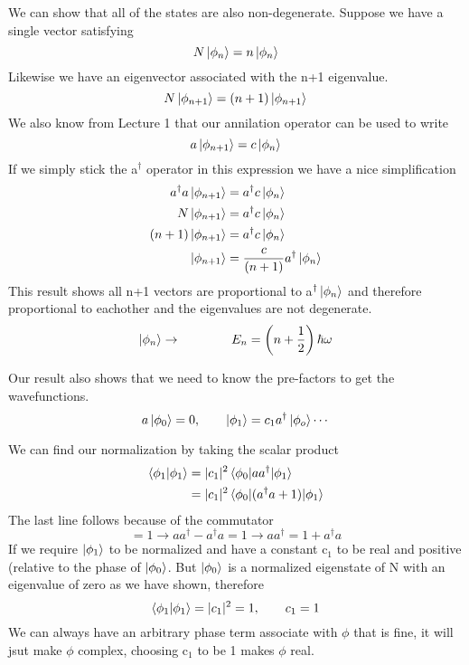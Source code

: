 \documentclass{article}
\newcommand{\be}{\begin{equation}}
\newcommand{\ee}{\end{equation}}
\newcommand{\dg}{\dagger}
\begin{document}
We can show that all of the states are also non-degenerate.
Suppose we have a single vector satisfying 
\be
N\ket{\phi_n} = n\ket{\phi_n}
\ee
Likewise we have an eigenvector associated with the n+1 eigenvalue.
\be
N\ket{\phi_{n+1}} = (n+1)\ket{\phi_{n+1}}
\ee
We also know from Lecture 1 that our annilation operator can be used to write
\be
a\ket{\phi_{n+1}} = c\ket{\phi_n}
\ee
If we simply stick the a$^\dg$ operator in this expression we have a nice simplification
\be
\begin{split}
    a^\dg a\ket{\phi_{n+1}} &= a^\dg c\ket{\phi_n}\\
    N\ket{\phi_{n+1}} &= a^\dg c\ket{\phi_n}\\
    (n+1)\ket{\phi_{n+1}} &= a^\dg c\ket{\phi_n}\\
    \ket{\phi_{n+1}} &= \frac{c}{(n+1)}a^\dg\ket{\phi_n}\\
\end{split}
\ee
This result shows all n+1 vectors are proportional to a$^\dg \ket{\phi_n}$ and therefore proportional to eachother and the eigenvalues are not degenerate. 
\be
\ket{\phi_n} \rightarrow \qquad \qquad E_n = \left(n + \frac{1}{2}\right)\hbar\omega
\ee

Our result also shows that we need to know the pre-factors to get the wavefunctions.
\be
a\ket{\phi_0} = 0, \qquad \ket{\phi_1} = c_1a^\dg\ket{\phi_o} \cdots
\ee

We can find our normalization by taking the scalar product
\be
\begin{split}
    \braket{\phi_1|\phi_1} &= |c_1|^2 \braket{\phi_0|aa^\dg|\phi_1}\\
    &= |c_1|^2 \braket{\phi_0|(a^\dg a+1)|\phi_1}
\end{split}
\ee
The last line follows because of the commutator
\be
[a,a^\dg] = 1 \rightarrow aa^\dg - a^\dg a = 1 \rightarrow  aa^\dg = 1 + a^\dg a
\ee
If we require $\ket{\phi_1}$ to be normalized and have a constant c$_1$ to be real and positive (relative to the phase of $\ket{\phi_0}$.
But $\ket{\phi_0}$ is a normalized eigenstate of N with an eigenvalue of zero as we have shown, therefore
\be
\braket{\phi_1|\phi_1} = |c_1|^2 = 1, \qquad c_1 = 1
\ee
We can always have an arbitrary phase term associate with $\phi$ that is fine, it will jsut make $\phi$ complex, choosing c$_1$ to be 1 makes $\phi$ real. 
\end{document}
